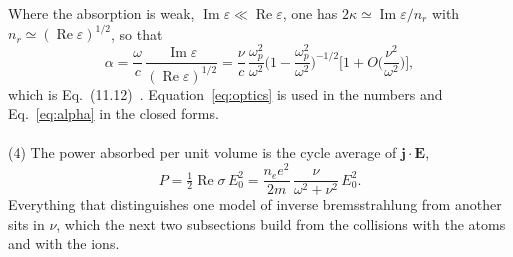 \documentclass[11pt]{article}
\numberwithin{equation}{section}
\newcommand{\Ev}{\mathbf E}
\newcommand{\jv}{\mathbf j}
\DeclareMathOperator{\Imag}{Im}
\DeclareMathOperator{\Real}{Re}
\begin{document}
Where the absorption is weak, $\Imag\varepsilon\ll\Real\varepsilon$, one has
$2\kappa\simeq\Imag\varepsilon/n_r$ with $n_r\simeq(\Real\varepsilon)^{1/2}$, so that
\begin{equation}
\boxed{\;\alpha=\frac{\omega}{c}\,\frac{\Imag\varepsilon}{(\Real\varepsilon)^{1/2}}
=\frac{\nu}{c}\,\frac{\omega_p^2}{\omega^2}\Big(1-\frac{\omega_p^2}{\omega^2}\Big)^{-1/2}
\Big[1+O\Big(\frac{\nu^2}{\omega^2}\Big)\Big],\;}
\label{eq:alpha}
\end{equation}
which is Eq.~(11.12)~\cite{Atzeni2004}. Equation~\eqref{eq:optics} is used in the numbers
and Eq.~\eqref{eq:alpha} in the closed forms.
\\ \\
{\noindent}(4) The power absorbed per unit volume is the cycle average of $\jv\cdot\Ev$,
\begin{equation}
\boxed{\;P=\tfrac12\Real\sigma\,E_0^2=\frac{n_ee^2}{2m}\,\frac{\nu}{\omega^2+\nu^2}\,E_0^2.\;}
\label{eq:P-drude}
\end{equation}
Everything that distinguishes one model of inverse bremsstrahlung from another sits in
$\nu$, which the next two subsections build from the collisions with the atoms and with
the ions.
\end{document}
